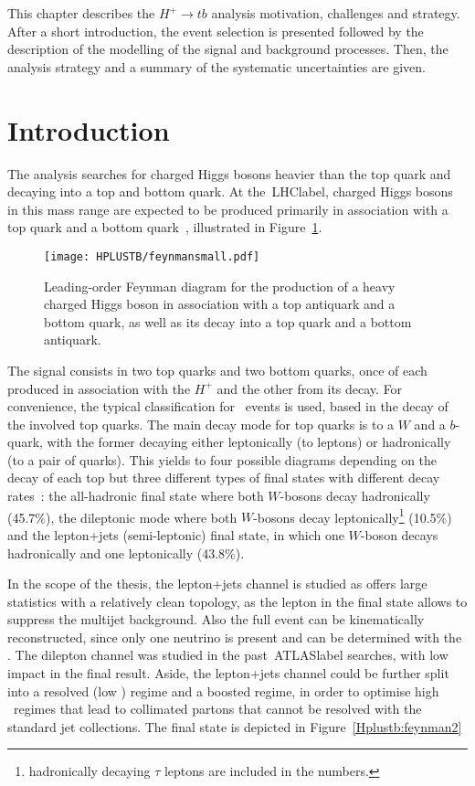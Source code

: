 This chapter describes the $H^+\to tb$ analysis motivation, challenges and strategy. After a short introduction, the event selection is presented followed by the description of the modelling of the signal and background processes. Then, the analysis strategy and a summary of the systematic uncertainties are given.



\section{Introduction}
The analysis searches for charged Higgs bosons heavier than the top quark and decaying into a top and bottom quark. At the~\acrshort{LHClabel}, charged Higgs bosons in this mass range are expected to be produced primarily in association with a top quark and a bottom quark~\cite{CYRM-2017-002}, illustrated in Figure~\ref{Hplustb:feynman1}.


\begin{figure}[htbp]
    \RawFloats
    \begin{center}
    \texttt{[image: HPLUSTB/feynmansmall.pdf]}
    \caption{
        Leading-order Feynman diagram for the production of a heavy charged Higgs boson in association with a top antiquark and a bottom quark, as well as its decay into a top quark and a bottom antiquark.
    }
    \label{Hplustb:feynman1}
    \end{center}
\end{figure}

The signal consists in two top quarks and two bottom quarks, once of each produced in association with the $H^+$ and the other from its decay. For convenience, the typical classification for \ttbar\ events is used, based in the decay of the involved top quarks. The main decay mode for top quarks is to a $W$ and a $b$-quark, with the former decaying either leptonically (to leptons) or hadronically (to a pair of quarks). This yields to four possible diagrams depending on the decay of each top but three different types of final states with different decay rates~\cite{pdg}: the all-hadronic final state where both $W$-bosons decay hadronically (45.7\%), the dileptonic mode where both $W$-bosons decay leptonically\footnote{hadronically decaying $\tau$ leptons are included in the numbers.} (10.5\%) and the lepton+jets (semi-leptonic) final state, in which one $W$-boson decays hadronically and one leptonically (43.8\%).

In the scope of the thesis, the lepton+jets channel is studied as offers large statistics with a relatively clean topology, as the lepton in the final state allows to suppress the multijet background. Also the full event can be kinematically reconstructed, since only one neutrino is present and can be determined with the \MET. The dilepton channel was studied in the past~\acrshort{ATLASlabel} searches, with low impact in the final result. Aside, the lepton+jets channel could be further split into a resolved (low \pT) regime and a boosted regime, in order to optimise high \pT\ regimes that lead to collimated partons that cannot be resolved with the standard jet collections. The final state is depicted in Figure~\ref{Hplustb:feynman2}

